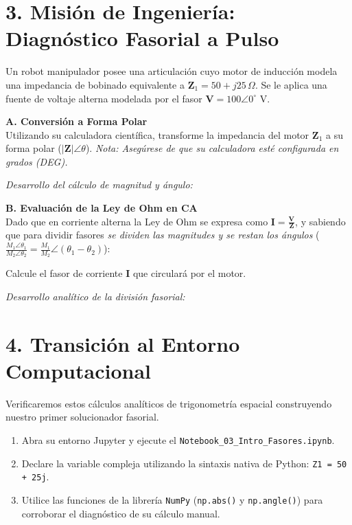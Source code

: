 \documentclass[11pt,a4paper]{article}
\begin{document}
\newpage

\section*{3. Misión de Ingeniería: Diagnóstico Fasorial a Pulso}

Un robot manipulador posee una articulación cuyo motor de inducción modela una impedancia de bobinado equivalente a $\mathbf{Z}_1 = 50 + j25 \, \Omega$. Se le aplica una fuente de voltaje alterna modelada por el fasor $\mathbf{V} = 100\angle0^\circ$ V.

\vspace{0.3cm}
\textbf{A. Conversión a Forma Polar} \\
Utilizando su calculadora científica, transforme la impedancia del motor $\mathbf{Z}_1$ a su forma polar ($|\mathbf{Z}|\angle\theta$). \textit{Nota: Asegúrese de que su calculadora esté configurada en grados (DEG).}

\begin{tcolorbox}[colback=white,colframe=UCBgray,height=4cm,valign=top]
\textit{Desarrollo del cálculo de magnitud y ángulo:}
\end{tcolorbox}

\textbf{B. Evaluación de la Ley de Ohm en CA} \\
Dado que en corriente alterna la Ley de Ohm se expresa como $\mathbf{I} = \frac{\mathbf{V}}{\mathbf{Z}}$, y sabiendo que para dividir fasores \textit{se dividen las magnitudes y se restan los ángulos} ($\frac{M_1\angle\theta_1}{M_2\angle\theta_2} = \frac{M_1}{M_2}\angle(\theta_1 - \theta_2)$):

Calcule el fasor de corriente $\mathbf{I}$ que circulará por el motor.

\begin{tcolorbox}[colback=white,colframe=UCBgray,height=4cm,valign=top]
\textit{Desarrollo analítico de la división fasorial:}
\end{tcolorbox}

\section*{4. Transición al Entorno Computacional}
Verificaremos estos cálculos analíticos de trigonometría espacial construyendo nuestro primer solucionador fasorial.
\begin{enumerate}
    \item Abra su entorno Jupyter y ejecute el \texttt{Notebook\_03\_Intro\_Fasores.ipynb}.
    \item Declare la variable compleja utilizando la sintaxis nativa de Python: \texttt{Z1 = 50 + 25j}.
    \item Utilice las funciones de la librería \texttt{NumPy} (\texttt{np.abs()} y \texttt{np.angle()}) para corroborar el diagnóstico de su cálculo manual.
\end{enumerate}
\end{document}
